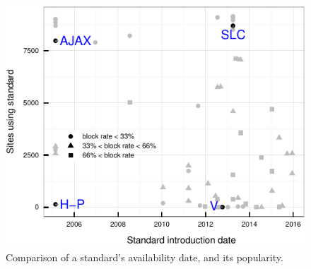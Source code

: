 \begin{figure}[ht]
  \centering
  \includegraphics[width=.5\textwidth]{figures/date_popularity.pdf}
  \caption{Comparison of a standard's availability date, and its popularity.}
  \label{fig:date_popularity}
\end{figure}
